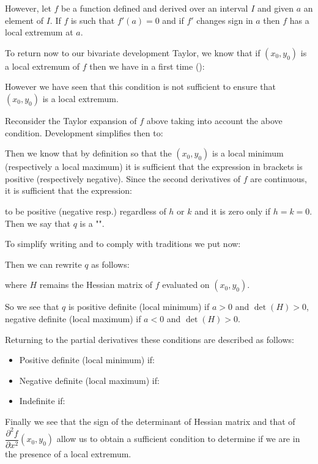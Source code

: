 	However, let $f$ be a function defined and derived over an interval $I$ and given $a$ an element of $I$. If $f$ is such that $f'(a)=0$ and if $f'$ changes sign in $a$ then $f$ has a local extremum at $a$.
	
	To return now to our bivariate development Taylor, we know that if $(x_0,y_0)$ is a local extremum of $f$ then we have in a first time ():
	
	However we have seen that this condition is not sufficient to ensure that $(x_0,y_0)$ is a local extremum.
	
	Reconsider the Taylor expansion of $f$ above taking into account the above condition. Development simplifies then to:
	
	Then we know that by definition so that the $(x_0,y_0)$ is a local minimum (respectively a local maximum) it is sufficient that the expression in brackets is positive (respectively negative). Since the second derivatives of $f$ are continuous, it is sufficient that the expression:
	
	to be positive (negative resp.) regardless of $h$ or $k$ and it is zero only if $h=k=0$. Then we say that $q$ is a "".
	
	To simplify writing and to comply with traditions we put now:
	
	Then we can rewrite $q$ as follows:
	
	where $H$ remains the Hessian matrix of $f$ evaluated on $(x_0,y_0)$.
	
	So we see that $q$ is positive definite (local minimum) if $a>0$ and $\det(H)>0$, negative definite (local maximum) if $a<0$ and $\det(H)>0$.
	
	Returning to the partial derivatives these conditions are described as follows:
	\begin{itemize}
		\item Positive definite (local minimum) if:
		
		
		\item Negative definite (local maximum) if:
		
		
		\item Indefinite if:
		
	\end{itemize}
	Finally we see that the sign of the determinant of Hessian matrix and that of $\dfrac{\partial^2 f}{\partial x^2}(x_0,y_0)$ allow us to obtain a sufficient condition to determine if we are in the presence of a local extremum.
	
